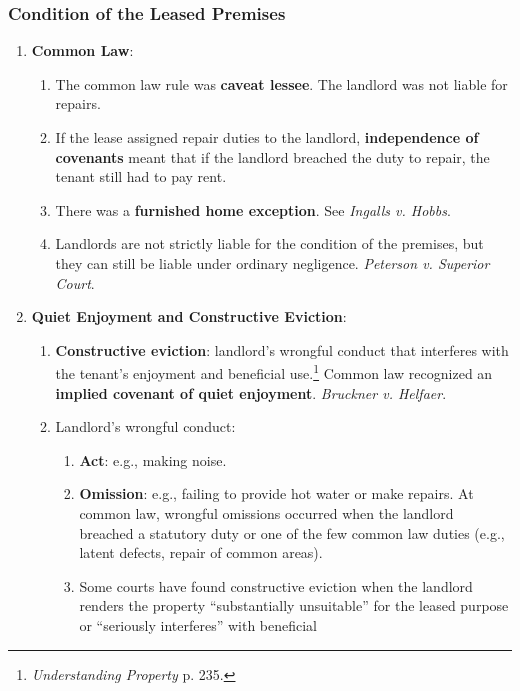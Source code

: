 \subsubsection{Condition of the Leased Premises}

\begin{enumerate}
    \item \textbf{Common Law}:
    \begin{enumerate}
        \item The common law rule was \textbf{caveat lessee}. The landlord was 
        not liable for repairs.
        \item If the lease assigned repair duties to the landlord, 
        \textbf{independence of covenants} meant that if the landlord breached 
        the duty to repair, the tenant still had to pay rent.
        \item There was a \textbf{furnished home exception}. See \emph{Ingalls 
        v. Hobbs}.
        \item Landlords are not strictly liable for the condition of the 
        premises, but they can still be liable under ordinary negligence. 
        \emph{Peterson v. Superior Court}.
    \end{enumerate}
    \item \textbf{Quiet Enjoyment and Constructive Eviction}:
    \begin{enumerate}
        \item \textbf{Constructive eviction}: landlord's wrongful conduct that 
        interferes with the tenant's enjoyment and beneficial 
        use.\footnote{\emph{Understanding Property} p. 235.} Common law 
        recognized an \textbf{implied covenant of quiet enjoyment}. 
        \emph{Bruckner v. Helfaer}.
        \item Landlord's wrongful conduct:
        \begin{enumerate}
            \item \textbf{Act}: e.g., making noise.
            \item \textbf{Omission}: e.g., failing to provide hot water or 
            make repairs. At common law, wrongful omissions occurred when the 
            landlord breached a statutory duty or one of the few common law 
            duties (e.g., latent defects, repair of common areas).
            \item Some courts have found constructive eviction when the 
            landlord renders the property ``substantially unsuitable'' for the 
            leased purpose or ``seriously interferes'' with beneficial 

\end{enumerate}
\end{enumerate}
\end{enumerate}
